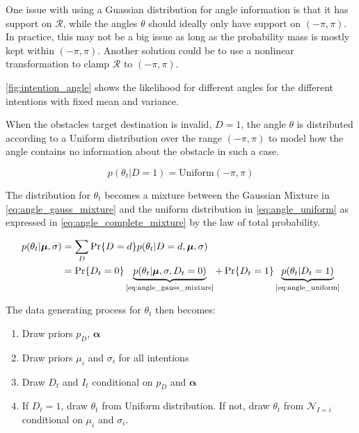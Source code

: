 One issue with using a Guassian distribution for angle information is that it has support on $\mathcal{R}$, while the angles $\theta$ should ideally only have support on $(-\pi, \pi)$. In practice, this may not be a big issue as long as the probability mass is mostly kept within $(-\pi, \pi)$. Another solution could be to use a nonlinear transformation to clamp $\mathcal{R}$ to $(-\pi, \pi)$.

\cref{fig:intention_angle} shows the likelihood for different angles for the different intentions with fixed mean and variance. 

When the obstacles target destination is invalid, $D=1$, the angle $\theta$ is distributed according to a Uniform distribution over the range $(-\pi, \pi)$ to model how the angle contains no information about the obstacle in such a case. 

\begin{equation}\label{eq:angle_uniform}
    p(\theta_t | D=1) = \text{Uniform}(-\pi, \pi)
\end{equation}

The distribution for $\theta_t$ becomes a mixture between the Gaussian Mixture in \cref{eq:angle_gauss_mixture} and the uniform distribution in  \cref{eq:angle_uniform} as expressed in \cref{eq:angle_complete_mixture} by the law of total probability.

\begin{align}\label{eq:angle_complete_mixture}
\begin{split}
     p(\theta_t | \boldsymbol{\mu}, \sigma)
     &= \sum_D \Pr\{D=d\} p(\theta_t | D=d, \boldsymbol{\mu}, \sigma)\\
     &= \Pr\{D_t = 0\} \underbrace{p(\theta_t | \boldsymbol{\mu}, \sigma, D_t=0)}_{\text{\cref{eq:angle_gauss_mixture}}} + \Pr\{D_t=1\}\underbrace{p(\theta_t | D_t=1)}_{\text{\cref{eq:angle_uniform}}}
\end{split}
\end{align}


The data generating process for $\theta_t$ then becomes:

\begin{enumerate}
    \item Draw priors $p_D$, $\boldsymbol{\alpha}$ 
    \item Draw priors $\mu_i$ and $\sigma_i$ for all intentions 
    \item Draw $D_t$ and $I_t$ conditional on $p_D$ and $\boldsymbol{\alpha}$
    \item If $D_t=1$, draw $\theta_t$ from Uniform distribution. If not, draw $\theta_t$ from $\mathcal{N}_{I=i}$ conditional on $\mu_i$ and $\sigma_i$.
\end{enumerate}


